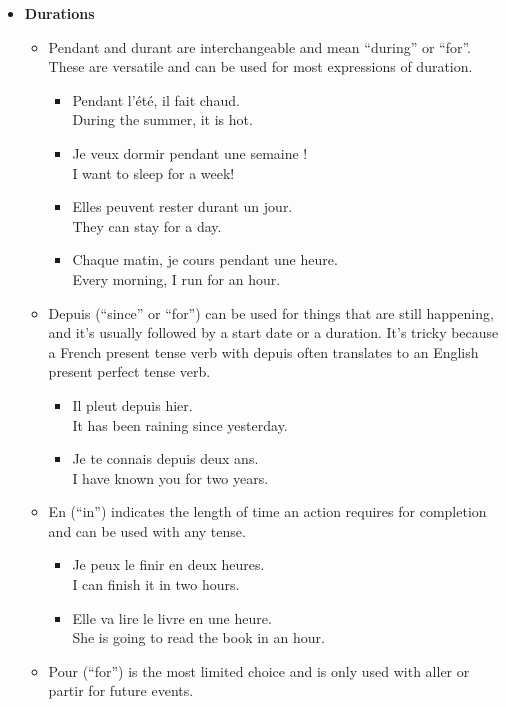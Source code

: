 \begin{itemize}
  \item  \textbf{Durations}  
    \begin{itemize}
      \item  Pendant and durant are interchangeable and mean ``during'' or ``for''. These are versatile and can be used for most expressions of duration.
        \begin{itemize}
          \item  Pendant l'{\'e}t{\'e}, il fait chaud. \\ During the summer, it is hot.
          \item  Je veux dormir pendant une semaine ! \\ I want to sleep for a week!
          \item  Elles peuvent rester durant un jour. \\ They can stay for a day.
          \item  Chaque matin, je cours pendant une heure. \\ Every morning, I run for an hour.
        \end{itemize}
       \item  Depuis (``since'' or ``for'') can be used for things that are still happening, and it's usually followed by a start date or a duration. It's tricky because a French present tense verb with depuis often translates to an English present perfect tense verb.
         \begin{itemize}
          \item  Il pleut depuis hier. \\ It has been raining since yesterday.
          \item  Je te connais depuis deux ans. \\ I have known you for two years.
        \end{itemize}
      \item  En (``in'') indicates the length of time an action requires for completion and can be used with any tense.
        \begin{itemize}
          \item  Je peux le finir en deux heures. \\ I can finish it in two hours.
          \item  Elle va lire le livre en une heure. \\ She is going to read the book in an hour.
        \end{itemize}
      \item  Pour (``for'') is the most limited choice and is only used with aller or partir for future events.

\end{itemize}
\end{itemize}
